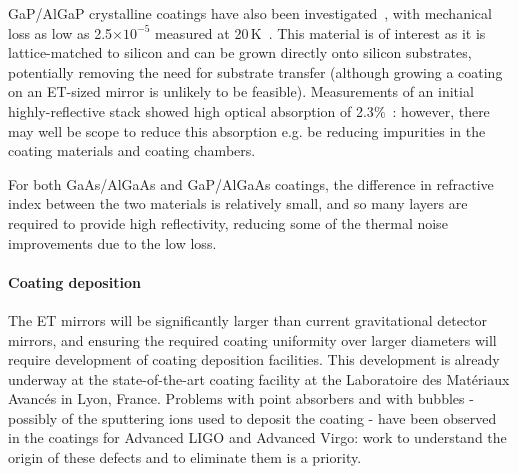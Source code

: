 GaP/AlGaP crystalline coatings have also been investigated~\cite{Lin}, with mechanical loss as low as 2.5$\times10^{-5}$ measured at 20\,K~\cite{Cumming_2015}. This material is of interest as it is lattice-matched to silicon and can be grown directly onto silicon substrates, potentially removing the need for substrate transfer (although growing a coating on an ET-sized mirror is unlikely to be feasible). Measurements of an initial highly-reflective stack showed high optical absorption of 2.3$\%$~\cite{Lin_2015}: however, there may well be scope to reduce this absorption e.g. be reducing impurities in the coating materials and coating chambers.   

For both GaAs/AlGaAs and GaP/AlGaAs coatings, the difference in refractive index between the two materials is relatively small, and so many layers are required to provide high reflectivity, reducing some of the thermal noise improvements due to the low loss.

\paragraph{Coating deposition}
The ET mirrors will be significantly larger than current gravitational detector mirrors, and ensuring the required coating uniformity over larger diameters will require development of coating deposition facilities. This development is already underway at the state-of-the-art coating facility at the Laboratoire des Matériaux Avancés in Lyon, France. Problems with point absorbers and with bubbles - possibly of the sputtering ions used to deposit the coating - have been observed in the coatings for Advanced LIGO and Advanced Virgo: work to understand the origin of these defects and to eliminate them is a priority. 

